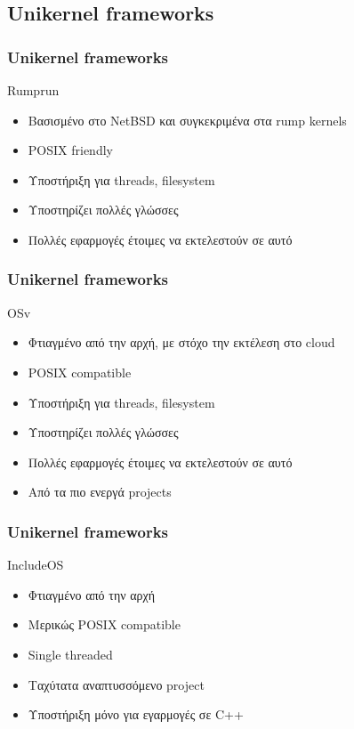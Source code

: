 \documentclass[red,slidestop,notes,compress,mathserif]{beamer}
\begin{document}
\subsection{Unikernel frameworks}

\begin{frame}
\frametitle{Unikernel frameworks}
	\begin{block}{Rumprun}
		\begin{itemize}
			\item Βασισμένο στο NetBSD και συγκεκριμένα στα rump kernels 
			\item POSIX friendly
			\item Υποστήριξη για threads, filesystem
			\item Υποστηρίζει πολλές γλώσσες
			\item Πολλές εφαρμογές έτοιμες να εκτελεστούν σε αυτό
		\end{itemize}
	\end{block}
\end{frame}
\begin{frame}
\frametitle{Unikernel frameworks}
	\begin{block}{OSv}
		\begin{itemize}
			\item Φτιαγμένο από την αρχή, με στόχο την εκτέλεση στο cloud
			\item POSIX compatible
			\item Υποστήριξη για threads, filesystem
			\item Υποστηρίζει πολλές γλώσσες
			\item Πολλές εφαρμογές έτοιμες να εκτελεστούν σε αυτό
			\item Από τα πιο ενεργά projects
		\end{itemize}
	\end{block}
\end{frame}
\begin{frame}
\frametitle{Unikernel frameworks}
	\begin{block}{IncludeOS}
		\begin{itemize}
			\item Φτιαγμένο από την αρχή
			\item Μερικώς POSIX compatible
			\item Single threaded
			\item Ταχύτατα αναπτυσσόμενο project
			\item Υποστήριξη μόνο για εγαρμογές σε C++
		\end{itemize}
	\end{block}
\end{frame}
\end{document}
